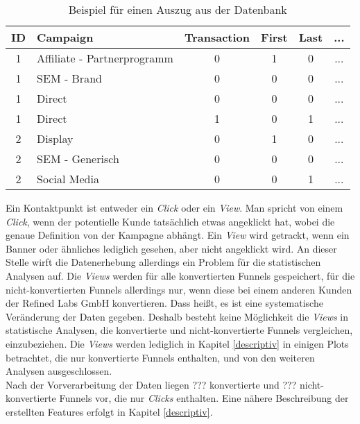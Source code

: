 \begin{table}[H]
	\begin{center}
		\begin{tabular}{|c|l|c|c|c|c|}
			\hline
			ID & Campaign 									 & Transaction & First & Last & ... \\ \hline\hline
			1  & Affiliate - Partnerprogramm & 0					 & 1		 & 0    & ... \\ \hline
			1  & SEM - Brand                 & 0					 & 0		 & 0    & ... \\ \hline
			1  & Direct                      & 0					 & 0		 & 0    & ... \\ \hline
			1  & Direct                      & 1					 & 0		 & 1    & ... \\ \hline
			2  & Display                     & 0					 & 1		 & 0    & ... \\ \hline
			2  & SEM - Generisch             & 0					 & 0		 & 0    & ... \\ \hline
			2  & Social Media                & 0					 & 0		 & 1    & ... \\ \hline
		\end{tabular} 
	\end{center}
	\caption{Beispiel für einen Auszug aus der Datenbank}\label{exdata}
\end{table}
Ein Kontaktpunkt ist entweder ein \textit{Click} oder ein \textit{View}. Man spricht von einem \textit{Click}, wenn der potentielle Kunde tatsächlich etwas angeklickt hat, wobei die genaue Definition von der Kampagne abhängt. Ein \textit{View} wird getrackt, wenn ein Banner oder ähnliches lediglich gesehen, aber nicht angeklickt wird. An dieser Stelle wirft die Datenerhebung allerdings ein Problem für die statistischen Analysen auf. Die \textit{Views} werden für alle konvertierten Funnels gespeichert, für die nicht-konvertierten Funnels allerdings nur, wenn diese bei einem anderen Kunden der Refined Labs GmbH konvertieren. Dass heißt, es ist eine systematische Veränderung der Daten gegeben. Deshalb besteht keine Möglichkeit die \textit{Views} in statistische Analysen, die konvertierte und nicht-konvertierte Funnels vergleichen, einzubeziehen. Die \textit{Views} werden lediglich in Kapitel \ref{descriptiv} in einigen Plots betrachtet, die nur konvertierte Funnels enthalten, und von den weiteren Analysen ausgeschlossen.\\
Nach der Vorverarbeitung der Daten liegen ??? konvertierte und ??? nicht-konvertierte Funnels vor, die nur \textit{Clicks} enthalten. Eine nähere Beschreibung der erstellten Features erfolgt in Kapitel \ref{descriptiv}.



